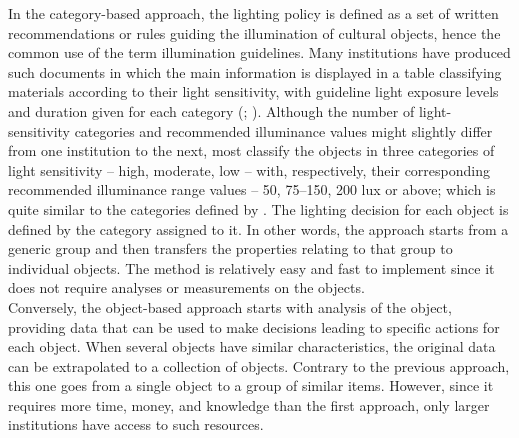 In the category-based approach, the lighting policy is defined as a set of written recommendations or rules guiding the illumination of cultural objects, hence the common use of the term illumination guidelines. Many institutions have produced such documents in which the main information is displayed in a table classifying materials according to their light sensitivity, with guideline light exposure levels and duration given for each category (\citealp[Tables 1 and 2]{ashley-smith_continuing_2002}; \citealp[10–11, Tables 2 and 3]{instituut_collectie_nederland_het_2005}). Although the number of light-sensitivity categories and recommended illuminance values might slightly differ from one institution to the next, most classify the objects in three categories of light sensitivity – high, moderate, low – with, respectively, their corresponding recommended illuminance range values – 50, 75–150, 200 lux or above; which is quite similar to the categories defined by \citet[23]{thomson_museum_1978}. The lighting decision for each object is defined by the category assigned to it. In other words, the approach starts from a generic group and then transfers the properties relating to that group to individual objects. The method is relatively easy and fast to implement since it does not require analyses or measurements on the objects. \\ 



Conversely, the object-based approach starts with analysis of the object, providing data that can be used to make decisions leading to specific actions for each object. When several objects have similar characteristics, the original data can be extrapolated to a collection of objects. Contrary to the previous approach, this one goes from a single object to a group of similar items. However, since it requires more time, money, and knowledge than the first approach, only larger institutions have access to such resources. \\


